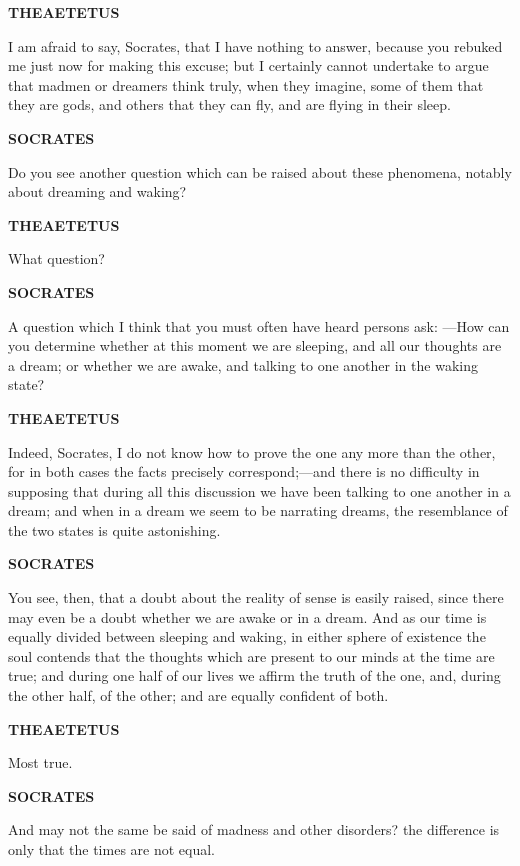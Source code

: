 \documentclass[11pt,letter]{article}
\begin{document}
\par \textbf{THEAETETUS}
\par   I am afraid to say, Socrates, that I have nothing to answer, because you rebuked me just now for making this excuse; but I certainly cannot undertake to argue that madmen or dreamers think truly, when they imagine, some of them that they are gods, and others that they can fly, and are flying in their sleep.

\par \textbf{SOCRATES}
\par   Do you see another question which can be raised about these phenomena, notably about dreaming and waking?

\par \textbf{THEAETETUS}
\par   What question?

\par \textbf{SOCRATES}
\par   A question which I think that you must often have heard persons ask: —How can you determine whether at this moment we are sleeping, and all our thoughts are a dream; or whether we are awake, and talking to one another in the waking state?

\par \textbf{THEAETETUS}
\par   Indeed, Socrates, I do not know how to prove the one any more than the other, for in both cases the facts precisely correspond;—and there is no difficulty in supposing that during all this discussion we have been talking to one another in a dream; and when in a dream we seem to be narrating dreams, the resemblance of the two states is quite astonishing.

\par \textbf{SOCRATES}
\par   You see, then, that a doubt about the reality of sense is easily raised, since there may even be a doubt whether we are awake or in a dream. And as our time is equally divided between sleeping and waking, in either sphere of existence the soul contends that the thoughts which are present to our minds at the time are true; and during one half of our lives we affirm the truth of the one, and, during the other half, of the other; and are equally confident of both.

\par \textbf{THEAETETUS}
\par   Most true.

\par \textbf{SOCRATES}
\par   And may not the same be said of madness and other disorders? the difference is only that the times are not equal.
\end{document}
